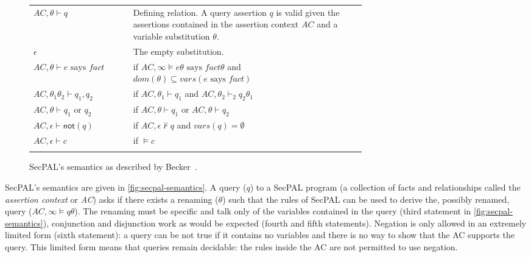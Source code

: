 \documentclass[thesis.tex]{subfiles}
\begin{document}
\begin{figure}\centering
  \begin{tabular}{l p{0.7\linewidth}}
    \toprule
    $AC,\theta \vdash q$                     & Defining relation. A query assertion $q$ is valid given the assertions contained in the assertion context $AC$ and a variable substitution $\theta$. \\
    $\epsilon$                               & The empty substitution.                                                                                                                              \\
    \midrule
    $AC,\theta \vdash e \text{ says } fact$  & if $AC,\infty \models e\theta \text{ says } fact\theta$ and $dom(\theta) \subseteq vars(e \text{ says } fact)$                                       \\
    $AC,\theta_1\theta_2 \vdash q_1, q_2$    & if $AC,\theta_1 \vdash q_1$ and $AC,\theta_2 \vdash_2 q_2\theta_1$                                                                                   \\
    $AC,\theta \vdash q_1 \text{ or } q_2$   & if $AC,\theta \vdash q_1$ or $AC,\theta \vdash q_2$                                                                                                  \\
    $AC,\epsilon \vdash \mathsf{not}(q)$     & if $AC,\epsilon \not\vdash q$ and $vars(q) = \emptyset$                                                                                              \\
    $AC,\epsilon \vdash c$                   & if $\models c$                                                                                                                                       \\
    \bottomrule                             \\
  \end{tabular}
  \caption[SecPAL's semantics.]{SecPAL's semantics as described by Becker~\cite{becker_secpal:_2010}.}
  \label{fig:secpal-semantics}
\end{figure}

SecPAL's semantics are given in \autoref{fig:secpal-semantics}.  A
query ($q$) to a SecPAL program (a collection of facts and
relationships called the \emph{assertion context} or \emph{AC}) asks
if there exists a renaming ($\theta$) such that the rules of SecPAL
can be used to derive the, possibly renamed, query ($AC,\infty \models
q\theta$).  The renaming must be specific and talk only of the
variables contained in the query (third statement in
\autoref{fig:secpal-semantics}), conjunction and disjunction work as
would be expected (fourth and fifth statements).  Negation is only
allowed in an extremely limited form (sixth statement): a query can be
not true if it contains no variables and there is no way to show that
the AC supports the query.  This limited form means that queries
remain decidable: the rules inside the AC are not permitted to use
negation.
\end{document}
